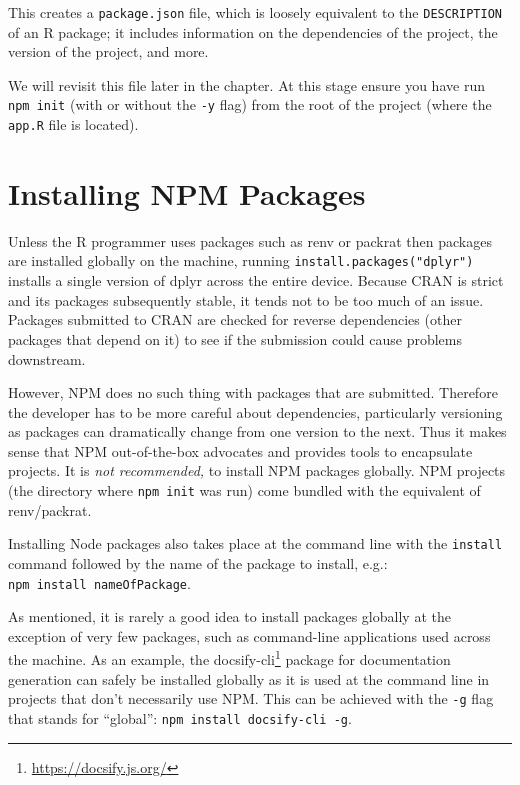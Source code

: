 \documentclass[10pt,]{krantz}
\renewcommand{\href}[2]{#2\footnote{\url{#1}}}
\begin{document}
This creates a \texttt{package.json} file, which is loosely equivalent to the \texttt{DESCRIPTION} of an R package; it includes information on the dependencies of the project, the version of the project, and more.

We will revisit this file later in the chapter. At this stage ensure you have run \texttt{npm\ init} (with or without the \texttt{-y} flag) from the root of the project (where the \texttt{app.R} file is located).

\hypertarget{webpack-intro-install-pkgs}{%
\section{Installing NPM Packages}\label{webpack-intro-install-pkgs}}

Unless the R programmer uses packages such as renv \citep{R-renv} or packrat \citep{R-packrat} then packages are installed globally on the machine, running \texttt{install.packages("dplyr")} installs a single version of dplyr across the entire device. Because CRAN is strict and its packages subsequently stable, it tends not to be too much of an issue. Packages submitted to CRAN are checked for reverse dependencies (other packages that depend on it) to see if the submission could cause problems downstream.

However, NPM does no such thing with packages that are submitted. Therefore the developer has to be more careful about dependencies, particularly versioning as packages can dramatically change from one version to the next. Thus it makes sense that NPM out-of-the-box advocates and provides tools to encapsulate projects. It is \emph{not recommended,} to install NPM packages globally. NPM projects (the directory where \texttt{npm\ init} was run) come bundled with the equivalent of renv/packrat.

Installing Node packages also takes place at the command line with the \texttt{install} command followed by the name of the package to install, e.g.: \texttt{npm\ install\ nameOfPackage}.

As mentioned, it is rarely a good idea to install packages globally at the exception of very few packages, such as command-line applications used across the machine. As an example, the \href{https://docsify.js.org/}{docsify-cli} package for documentation generation can safely be installed globally as it is used at the command line in projects that don't necessarily use NPM. This can be achieved with the \texttt{-g} flag that stands for ``global'': \texttt{npm\ install\ docsify-cli\ -g}.
\end{document}
